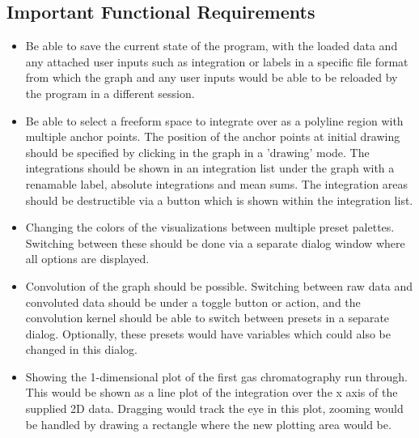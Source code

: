 \documentclass{article}
\begin{document}
\subsection*{Important Functional Requirements}
\begin{itemize}
    \item Be able to save the current state of the program, with the loaded data and any attached user inputs such as integration or labels in a specific file format from which the graph and any user inputs would be able to be reloaded by the program in a different session. 
	\item Be able to select a freeform space to integrate over as a polyline region with multiple anchor points. The position of the anchor points at initial drawing should be specified by clicking in the graph in a 'drawing' mode. The integrations should be shown in an integration list under the graph with a renamable label, absolute integrations and mean sums. The integration areas should be destructible via a button which is shown within the integration list.
	\item Changing the colors of the visualizations between multiple preset palettes. Switching between these should be done via a separate dialog window where all options are displayed.
	\item Convolution of the graph should be possible. Switching between raw data and convoluted data should be under a toggle button or action, and the convolution kernel should be able to switch between presets in a separate dialog. Optionally, these presets would have variables which could also be changed in this dialog.
	\item Showing the 1-dimensional plot of the first gas chromatography run through. This would be shown as a line plot of the integration over the x axis of the supplied 2D data. Dragging would track the eye in this plot, zooming would be handled by drawing a rectangle where the new plotting area would be.
\end{itemize}
\end{document}
